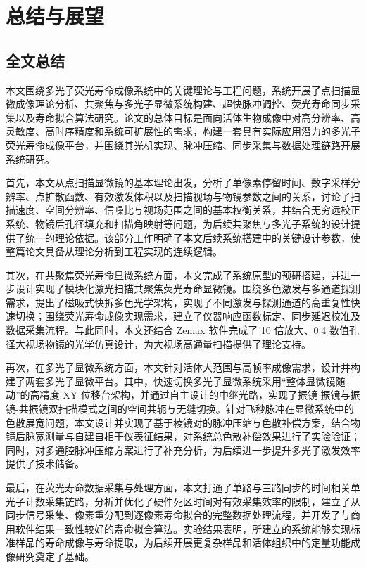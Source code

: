 \chapter{总结与展望}\label{Chap:7}

\section{全文总结}\label{7.1}

本文围绕多光子荧光寿命成像系统中的关键理论与工程问题，系统开展了点扫描显微成像理论分析、共聚焦与多光子显微系统构建、超快脉冲调控、荧光寿命同步采集以及寿命拟合算法研究。论文的总体目标是面向活体生物成像中对高分辨率、高灵敏度、高时序精度和系统可扩展性的需求，构建一套具有实际应用潜力的多光子荧光寿命成像平台，并围绕其光机实现、脉冲压缩、同步采集与数据处理链路开展系统研究。

首先，本文从点扫描显微镜的基本理论出发，分析了单像素停留时间、数字采样分辨率、点扩散函数、有效激发体积以及扫描视场与物镜参数之间的关系，讨论了扫描速度、空间分辨率、信噪比与视场范围之间的基本权衡关系，并结合无穷远校正系统、物镜后孔径填充和扫描角映射等问题，为后续共聚焦与多光子系统的设计提供了统一的理论依据。该部分工作明确了本文后续系统搭建中的关键设计参数，使整篇论文具备从理论分析到工程实现的连续逻辑。

其次，在共聚焦荧光寿命显微系统方面，本文完成了系统原型的预研搭建，并进一步设计实现了模块化激光扫描共聚焦荧光寿命显微镜。围绕多色激发与多通道探测需求，提出了磁吸式快拆多色光学架构，实现了不同激发与探测通道的高重复性快速切换；围绕荧光寿命成像实现需求，建立了仪器响应函数标定、同步延迟校准及数据采集流程。与此同时，本文还结合 Zemax 软件完成了 10 倍放大、0.4 数值孔径大视场物镜的光学仿真设计，为大视场高通量扫描提供了理论支持。

再次，在多光子显微系统方面，本文针对活体大范围与高帧率成像需求，设计并构建了两套多光子显微平台。其中，快速切换多光子显微系统采用“整体显微镜随动”的高精度 XY 位移台架构，并通过自主设计的中继光路，实现了振镜-振镜与振镜-共振镜双扫描模式之间的空间共轭与无缝切换。针对飞秒脉冲在显微系统中的色散展宽问题，本文设计并实现了基于棱镜对的脉冲压缩与色散补偿方案，结合物镜后脉宽测量与自建自相干仪表征结果，对系统总色散补偿效果进行了实验验证；同时，对多通腔脉冲压缩方案进行了补充分析，为后续进一步提升多光子激发效率提供了技术储备。

最后，在荧光寿命数据采集与处理方面，本文打通了单路与三路同步的时间相关单光子计数采集链路，分析并优化了硬件死区时间对有效采集效率的限制，建立了从同步信号采集、像素重分配到逐像素寿命拟合的完整数据处理流程，并开发了与商用软件结果一致性较好的寿命拟合算法。实验结果表明，所建立的系统能够实现标准样品的寿命成像与寿命提取，为后续开展更复杂样品和活体组织中的定量功能成像研究奠定了基础。

